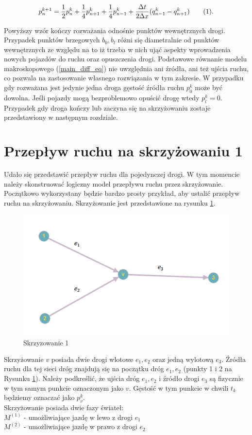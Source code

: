 \documentclass[12pt]{book}
\newcommand\addtag{\refstepcounter{equation}
\tag{\theequation}}
\begin{document}
\[ p_n^{k+1} =\frac{1}{2}p_n^k+\frac{1}{4}p_{n+1}^k+\frac{1}{4}p_{n-1}^k  +\frac{\Delta t}{2\Delta x}(q^k_{n-1}-q^k_{n+1})  \addtag \label{eq:final_normal_development}.\]


Powyższy wzór kończy rozważania odnośnie punktów wewnętrznych drogi.
Przypadek punktów brzegowych $b_0,b_l$ różni się diametralnie od punktów wewnętrznych ze względu na to iż trzeba w nich ująć aspekty wprowadzenia nowych pojazdów do ruchu oraz opuszczenia drogi. Podstawowe równanie modelu makroskopowego (\ref{main_diff_eq}) nie uwzględnia ani źródła, ani też ujścia ruchu, co pozwala na zastosowanie własnego rozwiązania w tym zakresie. W przypadku gdy rozważana jest jedynie jedna droga gęstość źródła ruchu $p_0^k$ może być dowolna. Jeśli pojazdy mogą bezproblemowo opuścić drogę wtedy $p_l^k=0$. Przypadek gdy droga kończy lub zaczyna się na skrzyżowaniu zostaje przedstawiony w następnym rozdziale.

\section{Przepływ ruchu na skrzyżowaniu 1}
Udało się przedstawić przepływ ruchu dla pojedynczej drogi. W tym momencie należy skonstruować logiczny model przepływu ruchu przez skrzyżowanie. Początkowo wykorzystany będzie bardzo prosty przykład, aby ustalić przepływ ruchu na skrzyżowaniu. Skrzyżowanie jest przedstawione na rysunku \ref{fig:skrz_1}.
\begin{figure}[H]
  \centering
    \includegraphics[width=14cm]{skrz_1}
 \caption{Skrzyzowanie 1}
 \label{fig:skrz_1}
\end{figure}
Skrzyżowanie $v$ posiada dwie drogi wlotowe $e_1,e_2$ oraz jedną wylotową $e_3$. Źródła ruchu dla tej sieci dróg znajdują się na początku dróg $e_1,e_2$ (punkty 1 i 2 na Rysunku \ref{fig:skrz_1}). Należy podkreślić, że ujścia dróg $e_1,e_2$ i źródło drogi $e_3$ są fizycznie w tym samym punkcie oznaczonym jako $v$. Gęstość w tym punkcie w chwili $t_k$ będziemy oznaczać jako $p_v^k$.\\
Skrzyżowanie posiada dwie fazy świateł:\\
$M^{(1)}$ - umożliwiające jazdę w lewo z drogi $e_1$\\
$M^{(2)}$ - umożliwiające jazdę w prawo z drogi $e_2$ \\
\end{document}
